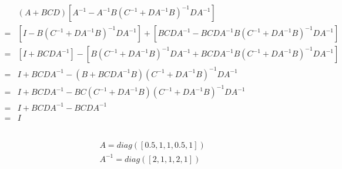 \documentclass{article}
\theoremstyle{definition} %
\begin{document}
\section{}

\subsection{}

\begin{align*}
	&(A+B C D)\left[A^{-1}-A^{-1} B\left(C^{-1}+D A^{-1} B\right)^{-1} D A^{-1}\right] \\
	=&\left[I-B\left(C^{-1}+D A^{-1} B\right)^{-1} D A^{-1}\right]+\left[B C D A^{-1}-B C D A^{-1} B\left(C^{-1}+D A^{-1} B\right)^{-1} D A^{-1}\right] \\
	=&\left[I+B C D A^{-1}\right]-\left[B\left(C^{-1}+D A^{-1} B\right)^{-1} D A^{-1}+B C D A^{-1} B\left(C^{-1}+D A^{-1} B\right)^{-1} D A^{-1}\right] \\
	=& I+B C D A^{-1}-\left(B+B C D A^{-1} B\right)\left(C^{-1}+D A^{-1} B\right)^{-1} D A^{-1} \\
	=& I+B C D A^{-1}-B C\left(C^{-1}+D A^{-1} B\right)\left(C^{-1}+D A^{-1} B\right)^{-1} D A^{-1} \\
	=& I+B C D A^{-1}-B C D A^{-1} \\
	=& I
\end{align*}

\subsection{}

\begin{align*}
	&A = diag([0.5, 1, 1, 0.5, 1])\\
	&A^{-1} = diag([2, 1, 1, 2, 1])
\end{align*}
\end{document}
